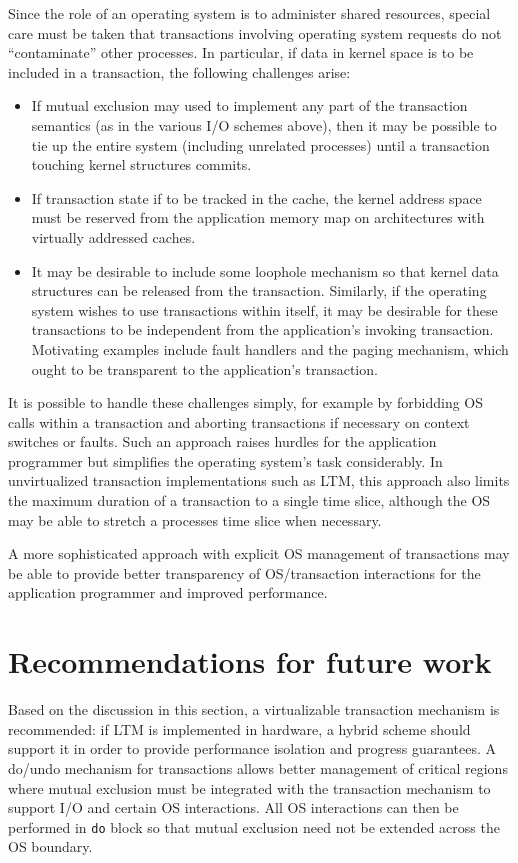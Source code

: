 Since the role of an operating system is to administer shared
resources, special care must be taken that transactions involving
operating system requests do not ``contaminate'' other processes.
In particular, if data in kernel space is to be included in a
transaction, the following challenges arise:
\begin{itemize}
\item If mutual exclusion may used to implement any part of the
transaction semantics (as in the various I/O schemes above), then it
may be possible to tie up the entire system (including unrelated
processes) until a transaction touching kernel structures commits.
\item If transaction state if to be tracked in the cache, the
kernel address space must be reserved from the application memory map
 on architectures with virtually addressed caches.
\item It may be desirable to include some loophole mechanism
 so that kernel data structures can be released from the transaction.
 Similarly, if the operating system wishes to use transactions within
 itself, it may be desirable for these transactions to be independent
 from the application's invoking transaction.  Motivating examples
 include fault handlers and the paging mechanism, which ought to be
 transparent to the application's transaction.  
\end{itemize}

It is possible to handle these challenges simply, for example by
forbidding OS calls within a transaction and aborting transactions if
necessary on context switches or faults.  Such an approach raises
hurdles for the application programmer but simplifies the operating
system's task considerably.  In unvirtualized transaction
implementations such as LTM, this approach also limits the maximum
duration of a transaction to a single time slice, although the OS may
be able to stretch a processes time slice when necessary.

A more sophisticated approach with explicit OS management of
transactions may be able to provide better transparency of
OS/transaction interactions for the application programmer and
improved performance.

\section{Recommendations for future work}
Based on the discussion in this section, a virtualizable transaction
mechanism is recommended: if LTM is implemented in hardware, a hybrid
scheme should support it in order to provide performance isolation and
progress guarantees.  A do/undo mechanism for transactions allows
better management of critical regions where mutual exclusion must be
integrated with the transaction mechanism to support I/O and certain
OS interactions.  All OS interactions can then be performed in
\texttt{do} block so that mutual exclusion need not be extended across
the OS boundary.

